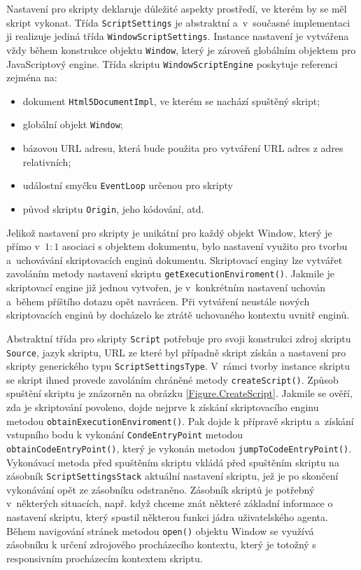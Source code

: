 Nastavení pro skripty deklaruje důležité aspekty prostředí, ve kterém by se měl skript vykonat. Třída \texttt{ScriptSettings} je abstraktní a~v~současné implementaci ji realizuje jediná třída \texttt{WindowScriptSettings}. Instance nastavení je vytvářena vždy během konstrukce objektu \texttt{Window}, který je zároveň globálním objektem pro JavaScriptový engine. Třída skriptu \texttt{WindowScriptEngine} poskytuje referenci zejména na:

\begin{itemize}
  \item dokument \texttt{Html5DocumentImpl}, ve kterém se nachází spuštěný skript;
  \item globální objekt \texttt{Window};
  \item bázovou URL adresu, která bude použita pro vytváření URL adres z adres relativních;
  \item událostní smyčku \texttt{EventLoop} určenou pro skripty
  \item původ skriptu \texttt{Origin}, jeho kódování, atd. 
\end{itemize}

Jelikož nastavení pro skripty je unikátní pro každý objekt Window, který je přímo v~$1:1$ asociaci s objektem dokumentu, bylo nastavení využito pro tvorbu a~uchovávání skriptovacích enginů dokumentu. Skriptovací enginy lze vytvářet zavoláním metody nastavení skriptu \texttt{getExecutionEnviroment()}. Jakmile je skriptovací engine již jednou vytvořen, je v~konkrétním nastavení uchován a~během příštího dotazu opět navrácen. Při vytváření neustále nových skriptovacích enginů by docházelo ke ztrátě uchovaného kontextu uvnitř enginů.

Abstraktní třída pro skripty \texttt{Script} potřebuje pro svoji konstrukci zdroj skriptu \texttt{Source}, jazyk skriptu, URL ze které byl případně skript získán a nastavení pro skripty generického typu \texttt{ScriptSettingsType}. V~rámci tvorby instance skriptu se skript ihned provede zavoláním chráněné metody \texttt{createScript()}. Způsob spuštění skriptu je znázorněn na obrázku \ref{Figure.CreateScript}. Jakmile se ověří, zda je skriptování povoleno, dojde nejprve k získání skriptovacího enginu metodou \texttt{obtainExecutionEnviroment()}. Pak dojde k přípravě skriptu a~získání vstupního bodu k vykonání \texttt{CondeEntryPoint} metodou \texttt{obtainCodeEntryPoint()}, který je vykonán metodou \texttt{jumpToCodeEntryPoint()}. Vykonávací metoda před spuštěním skriptu vkládá před spuštěním skriptu na zásobník \texttt{ScriptSettingsStack} aktuální nastavení skriptu, jež je po skončení vykonávání opět ze zásobníku odstraněno. Zásobník skriptů je potřebný v~některých situacích, např. když chceme znát některé základní informace o nastavení skriptu, který spustil některou funkci jádra uživatelského agenta. Během navigování stránek metodou \texttt{open()} objektu Window se využívá zásobníku k určení zdrojového procházecího kontextu, který je totožný s responsivním procházecím kontextem skriptu.

